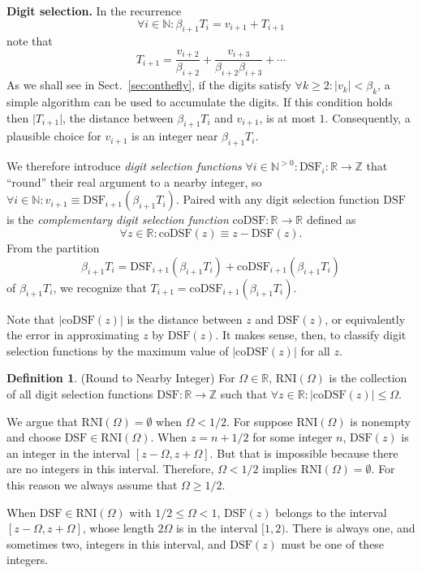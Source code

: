 \documentclass[10pt]{article}
\theoremstyle{definition}
\newtheorem{defn}[thm]{Definition}
\theoremstyle{remark}
\numberwithin{equation}{section}
\newcommand{\dsf}{\text{DSF}}
\newcommand{\codsf}{\text{coDSF}}
\newcommand{\rni}[1]{\text{RNI}({#1})}
\newcommand{\ints}{\mathbb{Z}}
\newcommand{\nats}{\mathbb{N}}
\newcommand{\pnats}{\mathbb{N}^{>0}}
\newcommand{\reals}{\mathbb{R}}
\newcommand{\abs}[1]{\lvert #1 \rvert}
\newcommand{\lead}[1]{\par\medskip\noindent\textbf{#1.}}
\begin{document}
\lead{Digit selection}
In the recurrence
\[
\forall i \in \nats: \beta_{i+1} T_{i} = v_{i+1} + T_{i+1}
\]
note that 
\[
T_{i+1} = \frac{v_{i+2}}{\beta_{i+2}} +
\frac{v_{i+3}}{\beta_{i+2}\beta_{i+3}} +  
\cdots
\]
As we shall see in Sect.~\ref{sec:onthefly}, if the digits satisfy $\forall k \ge 2: \abs{v_k} < \beta_k$,
a simple algorithm can be used to accumulate the digits.
If this condition holds then $\abs{T_{i+1}}$, the distance between
$\beta_{i+1} T_i$ and $v_{i+1}$, is at most $1$.
Consequently, a plausible choice for $v_{i+1}$ is an integer near $\beta_{i+1} T_i$. 

We therefore introduce \emph{digit selection functions} $\forall i \in \pnats: \dsf_i: \reals \rightarrow \ints$ that ``round'' their real argument to a nearby integer, so $\forall i \in \nats: v_{i+1} \equiv \dsf_{i+1}(\beta_{i+1}T_i)$.
Paired with any digit selection function $\dsf$ is the \emph{complementary digit selection function} $\codsf : \reals \rightarrow \reals$ defined as
\[
\forall z \in \reals: \codsf(z) \equiv z - \dsf(z) .
\]
From the partition
\[
\beta_{i+1}T_i = \dsf_{i+1}(\beta_{i+1}T_i) + \codsf_{i+1}(\beta_{i+1}T_i) 
\]
of $\beta_{i+1}T_i$, we recognize that $T_{i+1} =\codsf_{i+1}(\beta_{i+1}T_i)$.

Note that $\abs{\codsf(z)}$ is the distance between $z$ and $\dsf(z)$, or equivalently the error in approximating $z$ by $\dsf(z)$.
It makes sense, then, to classify digit selection functions by the maximum value of $\abs{\codsf(z)}$ for all $z$.

\begin{defn} (Round to Nearby Integer)
	For $\Omega \in \reals$, $\rni{\Omega}$ is the collection of all digit selection functions $\dsf: \reals \rightarrow \ints$ such that $\forall z \in \reals: \abs{\codsf(z)} \le \Omega$.
\end{defn}

We argue that $\rni{\Omega} = \emptyset$ when $\Omega < 1/2$. 
For suppose $\rni{\Omega}$ is nonempty and choose $\dsf \in \rni{\Omega}$. 
When $z = n + 1/2$ for some integer $n$, $\dsf(z)$ is an integer in the interval $[z-\Omega,z+\Omega]$. 
But that is impossible because there are no integers in this interval. Therefore, $\Omega < 1/2$ implies
$\rni{\Omega} = \emptyset$. For this reason we always assume that $\Omega \ge 1/2$. 

When $\dsf \in \rni{\Omega}$ with $1/2 \le \Omega < 1$, $\dsf(z)$ belongs to the interval $[z-\Omega,z+\Omega]$, whose length $2\Omega$ is in the interval $[1, 2)$.
There is always one, and sometimes two, integers in this interval, and $\dsf(z)$ must be one of these integers.
\end{document}
